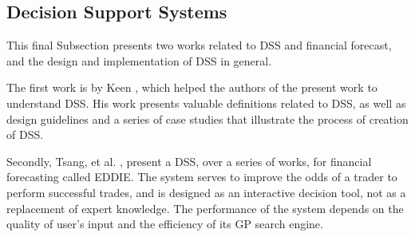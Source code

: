 \subsection{Decision Support Systems}
\label{decision-support-systems}

This final Subsection presents two works related to DSS and financial forecast, and the design and implementation of DSS in general.

The first work is by Keen \cite{keen1980decision}, which helped the authors of the present work to understand DSS. His work presents valuable definitions related to DSS, as well as design guidelines and a series of case studies that illustrate the process of creation of DSS.

Secondly, Tsang, et al. \cite{tsang1998eddie} \cite{tsang2000eddie} \cite{Tsang2004}  \cite{Tsang2008}, present a DSS, over a series of works, for financial forecasting called EDDIE. The system serves to improve the odds of a trader to perform successful trades, and is designed as an interactive decision tool, not as a replacement of expert knowledge. The performance of the system depends on the quality of user's input and the efficiency of its GP search engine.